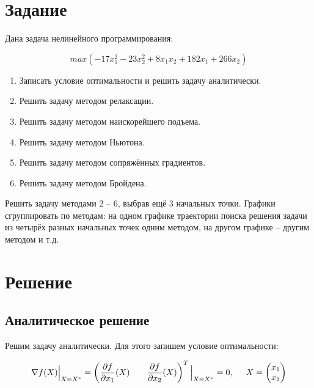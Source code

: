 





\section{Задание}

Дана задача нелинейного программирования:

\begin{displaymath}
	max \left( -17 x^2_1 - 23 x^2_2 + 8 x_1 x_2 + 182 x_1 + 266 x_2 \right)
\end{displaymath}

\begin{enumerate}

	\item Записать условие оптимальности и решить задачу аналитически.
	
	\item Решить задачу методом релаксации.
	
	\item Решить задачу методом наискорейшего подъема.
	
	\item Решить задачу методом Ньютона.	
	
	\item Решить задачу методом сопряжённых градиентов.

	\item Решить задачу методом Бройдена.

\end{enumerate}

Решить задачу методами 2 -- 6, выбрав ещё 3 начальных точки. Графики сгруппировать по методам: на одном графике траектории поиска решения задачи из четырёх разных начальных точек одним методом, на другом графике – другим методом и т.д. 

\section{Решение}

\subsection{Аналитическое решение}

Решим задачу аналитически. Для этого запишем условие оптимальности:

\begin{equation}
\label{eq:opt-cond}
	\nabla f(X) \Big|_{X = X^*} = \left(  \frac{\partial f}{\partial x_1}(X) \hspace{7mm} \frac{\partial f}{\partial x_2}(X) \right)^T \Big|_{X = X^*} = 0, \hspace{5mm} X = 
	\begin{pmatrix}
		x_1
		\\
		x_2
	\end{pmatrix}
\end{equation}

